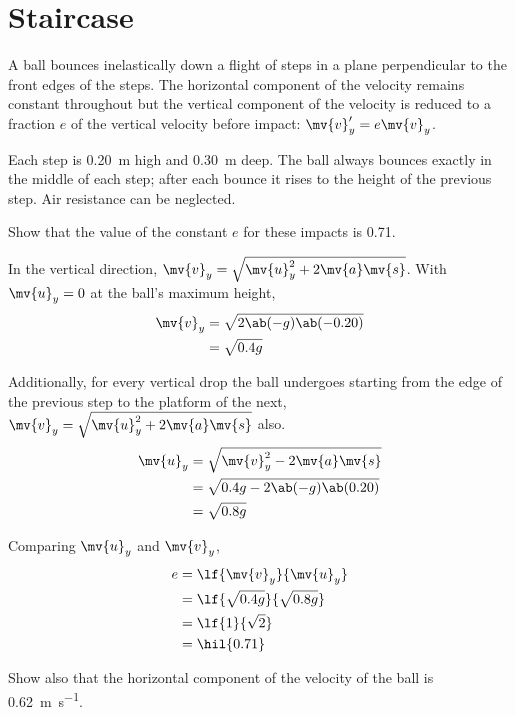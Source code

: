 \section{Staircase}
\begin{problem}
  A ball bounces inelastically down a flight of steps in a plane
  perpendicular to the front edges of the steps.
  The horizontal component of the velocity remains constant throughout
  but the vertical component of the velocity is reduced to a fraction
  \(e\) of the vertical velocity before impact: \(\mv{v}_y' = e\mv{v}_y\).

  Each step is \qty{0.20}{\metre} high and \qty{0.30}{\metre} deep.
  The ball always bounces exactly in the middle of each step; after
  each bounce it rises to the height of the previous step.
  Air resistance can be neglected.

  Show that the value of the constant \(e\) for these impacts is
  \num{0.71}.
\end{problem}

In the vertical direction, \(\mv{v}_y = \sqrt{\mv{u}_y^2 +
2\mv{a}\mv{s}}\). With \(\mv{u}_y = 0\)
at the ball's maximum height,
\begin{align*}
  \mv{v}_y &= \sqrt{2\ab(-g)\ab(-0.20)} \\
  &= \sqrt{0.4g}
\end{align*}

Additionally, for every vertical drop the ball undergoes starting
from the edge of the previous
step to the platform of the next, \(\mv{v}_y = \sqrt{\mv{u}_y^2 +
2\mv{a}\mv{s}}\) also.
\begin{align*}
  \mv{u}_y &= \sqrt{\mv{v}_y^2 - 2\mv{a}\mv{s}} \\
  &= \sqrt{0.4g - 2\ab(-g)\ab(0.20)} \\
  &= \sqrt{0.8g}
\end{align*}

Comparing \(\mv{u}_y\) and \(\mv{v}_y\),
\begin{align*}
  e &= \lf{\mv{v}_y}{\mv{u}_y} \\
  &= \lf{ \sqrt{0.4g} }{ \sqrt{0.8g} } \\
  &= \lf{1}{ \sqrt{2} } \\
  &= \hil{0.71}
\end{align*}

\begin{problem}
  Show also that the horizontal component of the velocity of the
  ball is \qty{0.62}{\metre\per\second}.
\end{problem}

